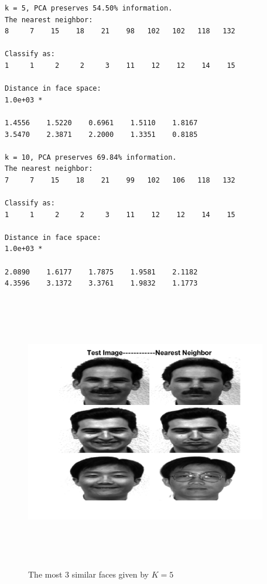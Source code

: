 \documentclass{article}
\theoremstyle{plain} \newtheorem{prop}{Proposition}
\begin{document}
\begin{verbatim}
k = 5, PCA preserves 54.50% information.
The nearest neighbor:
8     7    15    18    21    98   102   102   118   132

Classify as:
1     1     2     2     3    11    12    12    14    15

Distance in face space:
1.0e+03 *

1.4556    1.5220    0.6961    1.5110    1.8167
3.5470    2.3871    2.2000    1.3351    0.8185

k = 10, PCA preserves 69.84% information.
The nearest neighbor:
7     7    15    18    21    99   102   106   118   132

Classify as:
1     1     2     2     3    11    12    12    14    15

Distance in face space:
1.0e+03 *

2.0890    1.6177    1.7875    1.9581    2.1182
4.3596    3.1372    3.3761    1.9832    1.1773
\end{verbatim}

\begin{figure}
	\centering
	\includegraphics[width=300pt, height=345pt]{similar_faces_5.png}
	\caption{The most 3 similar faces given by $K=5$}
	\label{fig-4}
\end{figure}
\end{document}

